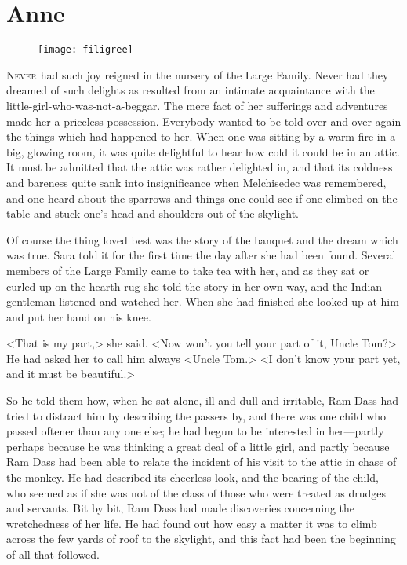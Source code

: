 \chapter{Anne}

\begin{figure}[t!]
\centering
\texttt{[image: filigree]}
\end{figure}

\lettrine[lines=5]{N}{ever} had such joy reigned in the nursery of the Large Family. Never had they dreamed of such delights as resulted from an intimate acquaintance with the little-girl-who-was-not-a-beggar. The mere fact of her sufferings and adventures made her a priceless possession. Everybody wanted to be told over and over again the things which had happened to her. When one was sitting by a warm fire in a big, glowing room, it was quite delightful to hear how cold it could be in an attic. It must be admitted that the attic was rather delighted in, and that its coldness and bareness quite sank into insignificance when Melchisedec was remembered, and one heard about the sparrows and things one could see if one climbed on the table and stuck one's head and shoulders out of the skylight.

Of course the thing loved best was the story of the banquet and the dream which was true. Sara told it for the first time the day after she had been found. Several members of the Large Family came to take tea with her, and as they sat or curled up on the hearth-rug she told the story in her own way, and the Indian gentleman listened and watched her. When she had finished she looked up at him and put her hand on his knee.

<That is my part,> she said. <Now won't you tell your part of it, Uncle Tom?> He had asked her to call him always <Uncle Tom.> <I don't know your part yet, and it must be beautiful.>

So he told them how, when he sat alone, ill and dull and irritable, Ram Dass had tried to distract him by describing the passers by, and there was one child who passed oftener than any one else; he had begun to be interested in her—partly perhaps because he was thinking a great deal of a little girl, and partly because Ram Dass had been able to relate the incident of his visit to the attic in chase of the monkey. He had described its cheerless look, and the bearing of the child, who seemed as if she was not of the class of those who were treated as drudges and servants. Bit by bit, Ram Dass had made discoveries concerning the wretchedness of her life. He had found out how easy a matter it was to climb across the few yards of roof to the skylight, and this fact had been the beginning of all that followed.

